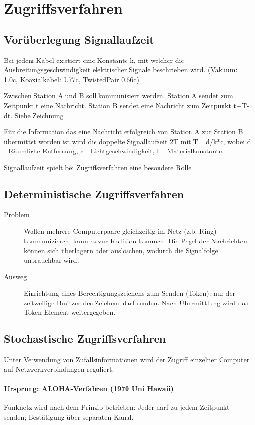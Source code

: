 \section{Zugriffsverfahren}

\subsection{Vorüberlegung Signallaufzeit}

Bei jedem Kabel existiert eine Konstante k, mit welcher die Ausbreitungsgeschwindigkeit  elektrischer Signale beschrieben wird. (Vakuum: 1.0c, Koaxialkabel: 0.77c, TwistedPair 0.66c)

Zwischen Station A und B soll kommuniziert werden. Station A sendet zum Zeitpunkt t eine Nachricht. Station B sendet eine Nachricht zum Zeitpunkt t+T-dt. Siehe Zeichnung

Für die Information das eine Nachricht erfolgreich von Station A zur Station B übermittet worden ist wird die doppelte Signallaufzeit 2T mit T =d/k*c, wobei d - Räumliche Entfernung, c - Lichtgeschwindigkeit, k - Materialkonstante.

Signallaufzeit spielt bei Zugriffsverfahren eine besondere Rolle. 

\subsection{Deterministische Zugriffsverfahren}

\begin{description}
\item[Problem] Wollen mehrere Computerpaare gleichzeitig im Netz (z.b. Ring) kommunizieren, kann es zur Kollision kommen. Die Pegel der Nachrichten können sich überlagern oder auslöschen, wodurch die Signalfolge unbrauchbar wird. 
\item[Ausweg] Einrichtung eines Berechtigungszeichens zum Senden (Token): nur der zeitweilige Besitzer des Zeichens darf senden. Nach Übermittlung wird das Token-Element weitergegeben.
\end{description}

\subsection{Stochastische Zugriffsverfahren}

Unter Verwendung von Zufallsinformationen wird der Zugriff einzelner Computer auf Netzwerkverbindungen reguliert. 

\paragraph{Ursprung: ALOHA-Verfahren (1970 Uni Hawaii)}
Funknetz wird nach dem Prinzip betrieben: Jeder darf zu jedem Zeitpunkt senden; Bestätigung über separaten Kanal. 

